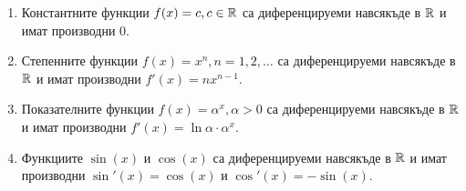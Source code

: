 \documentclass[numbers=endperiod, DIV=15, bibliography=totocnumbered]{scrartcl}
\begin{document}
\begin{theorem}
  \mbox{}
  \begin{enumerate}
    \item Константните функции $f(x) = c, c \in \mathbb{R}$ са диференцируеми навсякъде в $\mathbb{R}$ и имат производни $0$.
    \item Степенните функции $f(x) = x^n, n = 1, 2, \ldots$ са диференцируеми навсякъде в $\mathbb{R}$ и имат производни $f'(x) = n x^{n-1}$.
    \item Показателните функции $f(x) = \alpha^x, \alpha > 0$ са диференцируеми навсякъде в $\mathbb{R}$ и имат производни $f'(x) = \ln \alpha \cdot \alpha^x$.
    \item Функциите $\sin(x)$ и $\cos(x)$ са диференцируеми навсякъде в $\mathbb{R}$ и имат производни $\sin'(x) = \cos(x)$ и $\cos'(x) = -\sin(x)$.
  \end{enumerate}
\end{theorem}
\end{document}
